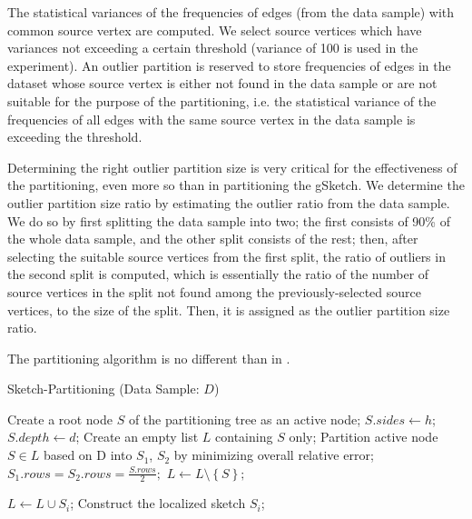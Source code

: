 The statistical variances of the frequencies of edges (from the data sample) with common source vertex are computed. We select source vertices which have variances not exceeding a certain threshold (variance of 100 is used in the experiment). An outlier partition is reserved to store frequencies of edges in the dataset whose source vertex is either not found in the data sample or are not suitable for the purpose of the partitioning, i.e. the statistical variance of the frequencies of all edges with the same source vertex in the data sample is exceeding the threshold.

Determining the right outlier partition size is very critical for the effectiveness of the partitioning, even more so than in partitioning the gSketch\cite{DBLP}. We determine the outlier partition size ratio by estimating the outlier ratio from the data sample. We do so by first splitting the data sample into two; the first consists of 90\% of the whole data sample, and the other split consists of the rest; then, after selecting the suitable source vertices from the first split, the ratio of outliers in the second split is computed, which is essentially the ratio of the number of source vertices in the split not found among the previously-selected source vertices, to the size of the split. Then, it is assigned as the outlier partition size ratio.

The partitioning algorithm is no different than in \cite{DBLP}. 

\begin{algorithm}
\caption{Sketch-Partitioning (Data Sample: $D$)}\label{euclid}
\begin{algorithmic}[1]

\State Create a root node $S$ of the partitioning tree as an
active node;
\State $S.sides \gets h$;
\State $S.depth \gets d$;
\State Create an empty list $L$ containing $S$ only;
\State Partition active node $S \in L$ based on D into $S_1$, $S_2$ by minimizing overall relative error;
\State $S_1.rows = S_2.rows = \frac{S.rows}{2};$
\State $L \gets L \setminus \left \{ S \right \};$
    
    \State $L \gets L \cup S_i$;
    \Else
    \State Construct the localized sketch $S_i$;
    
    \EndIf
\EndFor
\EndWhile

\end{algorithmic}
\end{algorithm}


